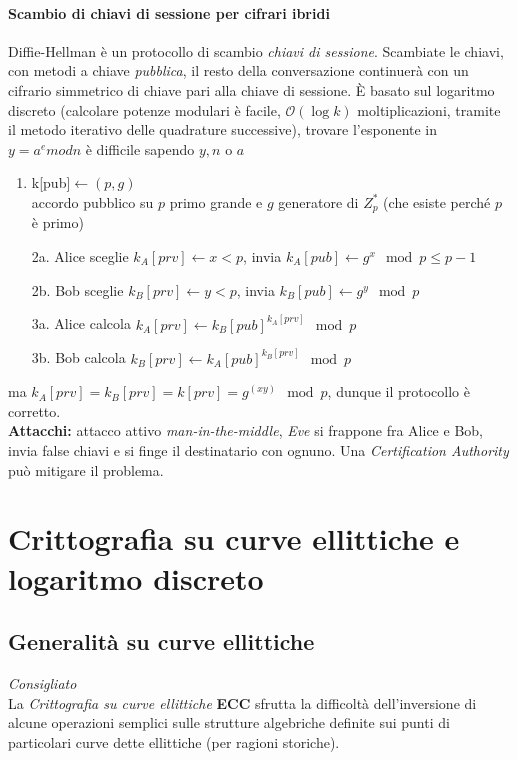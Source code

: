 \documentclass{article}
\begin{document}
\paragraph{Scambio di chiavi di sessione per cifrari ibridi}
Diffie-Hellman è un protocollo di scambio \textit{chiavi di sessione}. Scambiate le chiavi, con metodi a chiave \textit{pubblica}, il resto della conversazione continuerà con un cifrario simmetrico di chiave pari alla chiave di sessione. 
\`E basato sul logaritmo discreto (calcolare potenze modulari è facile, $ \mathcal{O}(\log k) $ moltiplicazioni, tramite il metodo iterativo delle quadrature successive), trovare l'esponente in $y=a^e mod n$ è difficile sapendo $y,n$ o $a$
\begin{enumerate}
    \item k[pub]$\leftarrow (p,g)$\\
    accordo pubblico su $p$ primo grande e $g$ generatore di $Z^*_p$ (che esiste perché $p$ è primo)
    
    \item[2a.] Alice sceglie $k_A[prv]\leftarrow x<p$, invia $k_A[pub]\leftarrow g^x \mod p\le p-1$
    
    \item[2b.] Bob sceglie $k_B[prv]\leftarrow y<p$, invia $k_B[pub]\leftarrow g^y \mod p$
    
    \item[3a.] Alice calcola $k_A[prv]\leftarrow k_B[pub]^{k_A[prv]} \mod p$
    \item[3b.] Bob calcola $k_B[prv]\leftarrow k_A[pub]^{k_B[prv]}\mod p$
\end{enumerate}
ma $k_A[prv]=k_B[prv]=k[prv]=g^(xy)\mod p$, dunque il protocollo è corretto.\\
\textbf{Attacchi:} attacco attivo \textit{man-in-the-middle}, \textit{Eve} si frappone fra Alice e Bob, invia false chiavi e si finge il destinatario con ognuno. Una \textit{Certification Authority} può mitigare il problema.

\section{Crittografia su curve ellittiche e logaritmo discreto}
\subsection{Generalità su curve ellittiche}
\textit{Consigliato}\\
La \textit{Crittografia su curve ellittiche} \textbf{ECC} sfrutta la difficoltà dell'inversione di alcune operazioni semplici sulle strutture algebriche definite sui punti di particolari curve dette ellittiche (per ragioni storiche).
\end{document}
